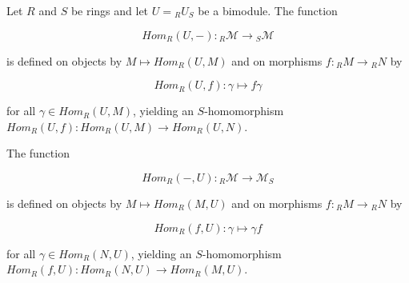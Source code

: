 Let $R$ and $S$ be rings and let $U = {}_R U_S$ be a bimodule. The function

$$Hom_R(U, -): {}_R\mathcal{M} \to {}_S\mathcal{M}$$

is defined on objects by $M \mapsto Hom_R(U, M)$ and on morphisms $f: {}_R M \to {}_R N$ by

$$Hom_R(U, f): \gamma \mapsto f\gamma$$

for all $\gamma \in Hom_R(U, M)$, yielding an $S$-homomorphism $Hom_R(U, f): Hom_R(U, M) \to Hom_R(U, N)$.

The function

$$Hom_R(-, U): {}_R\mathcal{M} \to \mathcal{M}_S$$

is defined on objects by $M \mapsto Hom_R(M, U)$ and on morphisms $f: {}_R M \to {}_R N$ by

$$Hom_R(f, U): \gamma \mapsto \gamma f$$

for all $\gamma \in Hom_R(N, U)$, yielding an $S$-homomorphism $Hom_R(f, U): Hom_R(N, U) \to Hom_R(M, U)$.
